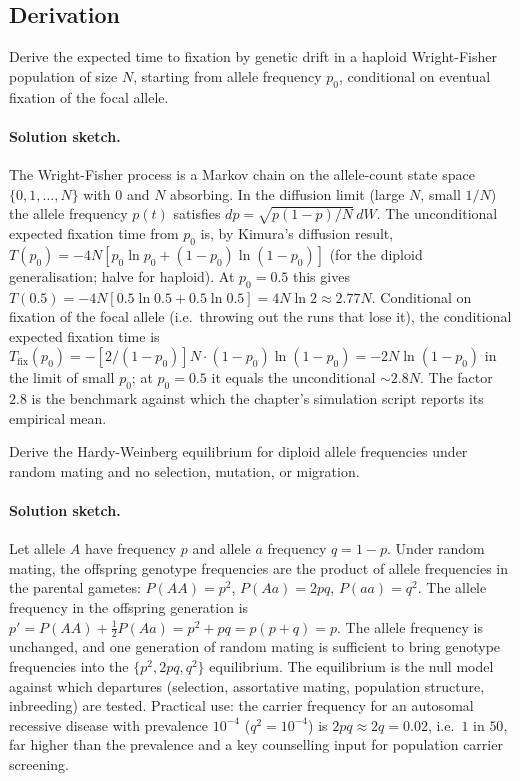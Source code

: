 \subsection*{Derivation}

\begin{exercise}
Derive the expected time to fixation by genetic drift in a haploid
Wright-Fisher population of size $N$, starting from allele frequency
$p_0$, conditional on eventual fixation of the focal allele.
\end{exercise}

\paragraph{Solution sketch.} The Wright-Fisher process is a Markov
chain on the allele-count state space $\{0, 1, \ldots, N\}$ with
$0$ and $N$ absorbing. In the diffusion limit (large $N$, small
$1/N$) the allele frequency $p(t)$ satisfies
$dp = \sqrt{p(1-p)/N}\,dW$. The unconditional expected fixation time
from $p_0$ is, by Kimura's diffusion result,
$T(p_0) = -4 N [p_0 \ln p_0 + (1 - p_0) \ln(1 - p_0)]$ (for the
diploid generalisation; halve for haploid). At $p_0 = 0.5$ this gives
$T(0.5) = -4 N [0.5 \ln 0.5 + 0.5 \ln 0.5] = 4 N \ln 2 \approx
2.77 N$. Conditional on fixation of the focal allele (i.e.\ throwing
out the runs that lose it), the conditional expected fixation time
is
$T_\text{fix}(p_0) = -[2/(1 - p_0)] N \cdot (1 - p_0) \ln(1 - p_0)
= -2 N \ln(1 - p_0)$ in the limit of small $p_0$; at $p_0 = 0.5$
it equals the unconditional $\sim 2.8 N$. The factor $2.8$ is the
benchmark against which the chapter's simulation script reports
its empirical mean.

\begin{exercise}
Derive the Hardy-Weinberg equilibrium for diploid allele frequencies
under random mating and no selection, mutation, or migration.
\end{exercise}

\paragraph{Solution sketch.} Let allele $A$ have frequency $p$ and
allele $a$ frequency $q = 1 - p$. Under random mating, the offspring
genotype frequencies are the product of allele frequencies in the
parental gametes: $P(AA) = p^2$, $P(Aa) = 2pq$, $P(aa) = q^2$. The
allele frequency in the offspring generation is
$p' = P(AA) + \frac{1}{2}P(Aa) = p^2 + pq = p(p + q) = p$. The allele
frequency is unchanged, and one generation of random mating is
sufficient to bring genotype frequencies into the
$\{p^2, 2pq, q^2\}$ equilibrium. The equilibrium is the null model
against which departures (selection, assortative mating, population
structure, inbreeding) are tested. Practical use: the carrier
frequency for an autosomal recessive disease with prevalence
$10^{-4}$ ($q^2 = 10^{-4}$) is $2 p q \approx 2 q = 0.02$, i.e.\ $1$
in $50$, far higher than the prevalence and a key counselling input
for population carrier screening.

